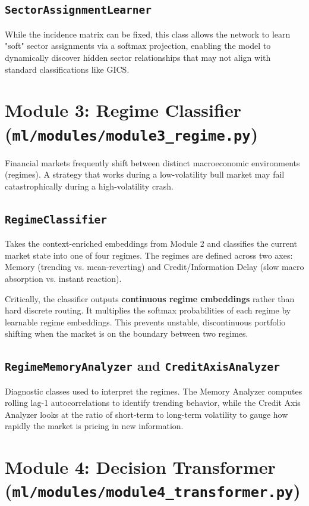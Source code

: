 \documentclass[12pt,a4paper]{report}
\begin{document}
\subsection{\texttt{SectorAssignmentLearner}}
While the incidence matrix can be fixed, this class allows the network to learn "soft" sector assignments via a softmax projection, enabling the model to dynamically discover hidden sector relationships that may not align with standard classifications like GICS.

\section{Module 3: Regime Classifier (\texttt{ml/modules/module3\_regime.py})}
Financial markets frequently shift between distinct macroeconomic environments (regimes). A strategy that works during a low-volatility bull market may fail catastrophically during a high-volatility crash.

\subsection{\texttt{RegimeClassifier}}
Takes the context-enriched embeddings from Module 2 and classifies the current market state into one of four regimes. The regimes are defined across two axes: Memory (trending vs. mean-reverting) and Credit/Information Delay (slow macro absorption vs. instant reaction). 

Critically, the classifier outputs \textbf{continuous regime embeddings} rather than hard discrete routing. It multiplies the softmax probabilities of each regime by learnable regime embeddings. This prevents unstable, discontinuous portfolio shifting when the market is on the boundary between two regimes.

\subsection{\texttt{RegimeMemoryAnalyzer} and \texttt{CreditAxisAnalyzer}}
Diagnostic classes used to interpret the regimes. The Memory Analyzer computes rolling lag-1 autocorrelations to identify trending behavior, while the Credit Axis Analyzer looks at the ratio of short-term to long-term volatility to gauge how rapidly the market is pricing in new information.

\section{Module 4: Decision Transformer (\texttt{ml/modules/module4\_transformer.py})}
\end{document}
